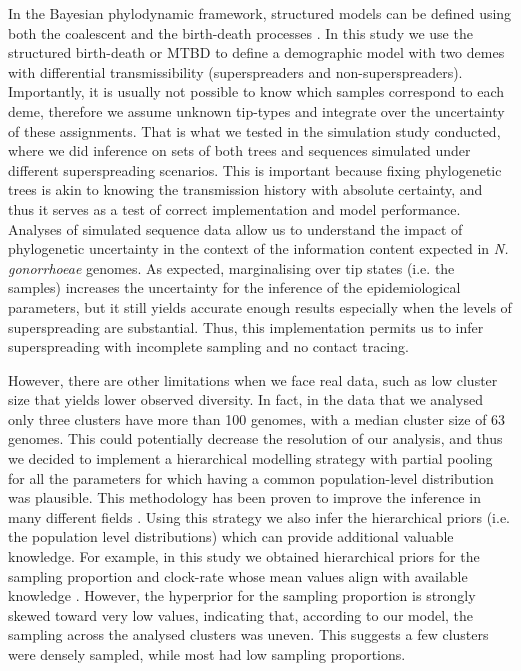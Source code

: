\documentclass[lineno,pdflatex,sn-nature]{sn-jnl}%
\theoremstyle{thmstyleone}%
\theoremstyle{thmstyletwo}%
\theoremstyle{thmstylethree}%
\begin{document}
In the Bayesian phylodynamic framework, structured models can be defined using both the coalescent and the birth-death processes \cite{volz2012complex, volz2018bayesian, RefWorks:kuhnert2016phylodynamics}. In this study we use the structured birth-death or MTBD to define a demographic model with two demes with differential transmissibility (superspreaders and non-superspreaders). Importantly, it is usually not possible to know which samples correspond to each deme, therefore we assume unknown tip-types and integrate over the uncertainty of these assignments. That is what we tested in the simulation study conducted, where we did inference on sets of both trees and sequences simulated under different superspreading scenarios. This is important because fixing phylogenetic trees is akin to knowing the transmission history with absolute certainty, and thus it serves as a test of correct implementation and model performance. Analyses of simulated sequence data allow us to understand the impact of phylogenetic uncertainty in the context of the information content expected in \textit{N. gonorrhoeae} genomes. As expected, marginalising over tip states (i.e. the samples) increases the uncertainty for the inference of the epidemiological parameters, but it still yields accurate enough results especially when the levels of superspreading are substantial. Thus, this implementation permits us to infer superspreading with incomplete sampling and no contact tracing. \newline


However, there are other limitations when we face real data, such as low cluster size that yields lower observed diversity. In fact, in the data that we analysed only three clusters have more than 100 genomes, with a median cluster size of 63 genomes. This could potentially decrease the resolution of our analysis, and thus we decided to implement a hierarchical modelling strategy with partial pooling for all the parameters for which having a common population-level distribution was plausible. This methodology has been proven to improve the inference in many different fields \cite{Choi2019bayesian, Dimmock2025hierarchical,Nadeau2022swiss, Weber2025Identification, weber2023Reconstructing}. Using this strategy we also infer the hierarchical priors (i.e. the population level distributions) which can provide additional valuable knowledge. For example, in this study we obtained hierarchical priors for the sampling proportion and clock-rate whose mean values align with available knowledge \cite{Taouk2024longitudinal, Snchez-Bus2019impact}. However, the hyperprior for the sampling proportion is strongly skewed toward very low values, indicating that, according to our model, the sampling across the analysed clusters was uneven. This suggests a few clusters were densely sampled, while most had low sampling proportions. \newline
\end{document}
